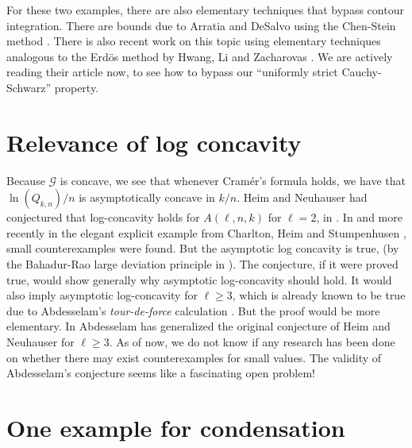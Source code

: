 \documentclass[12pt]{article}
\begin{document}
For these two examples, there are also elementary techniques that bypass contour integration.
There are bounds due to Arratia and DeSalvo using the Chen-Stein method \cite{ArratiaDeSalvo}.
There is also recent work on this topic using elementary techniques analogous to the Erd\"os method by 
Hwang, Li and Zacharovas
\cite{HwangLiZacharovas}.
We are actively reading their article now, to see how to bypass our ``uniformly strict Cauchy-Schwarz'' property.

\section{Relevance of log concavity}

Because $\mathcal{G}$ is concave, we see that whenever Cram\'er's formula holds, we have that
$\ln(Q_{k,n})/n$ is asymptotically concave in $k/n$. Heim and Neuhauser had conjectured that log-concavity holds
for $A(\ell,n,k)$ for $\ell=2$, in \cite{HeimNeuhauser}. In \cite{StarrSmall} and more recently in the elegant explicit example from 
Charlton, Heim and Stumpenhusen \cite{CHS}, small counterexamples were found.
But the asymptotic log concavity is true, (by the Bahadur-Rao large deviation principle in \cite{StarrLDP}).
The conjecture, if it were proved true, would show generally why asymptotic log-concavity should hold.
It would also imply asymptotic log-concavity for $\ell\geq 3$, which is already known to be true due to Abdesselam's 
{\em tour-de-force} calculation \cite{Abdesselam2}. But the proof would be more elementary.
In \cite{Abdesselam0} Abdesselam has generalized the original conjecture of Heim and Neuhauser for $\ell\geq 3$.
As of now, we do not know if any research has been done on whether there may exist counterexamples for small values.
The validity of Abdesselam's conjecture seems like a fascinating open problem!

\section{One example for condensation}
\end{document}
